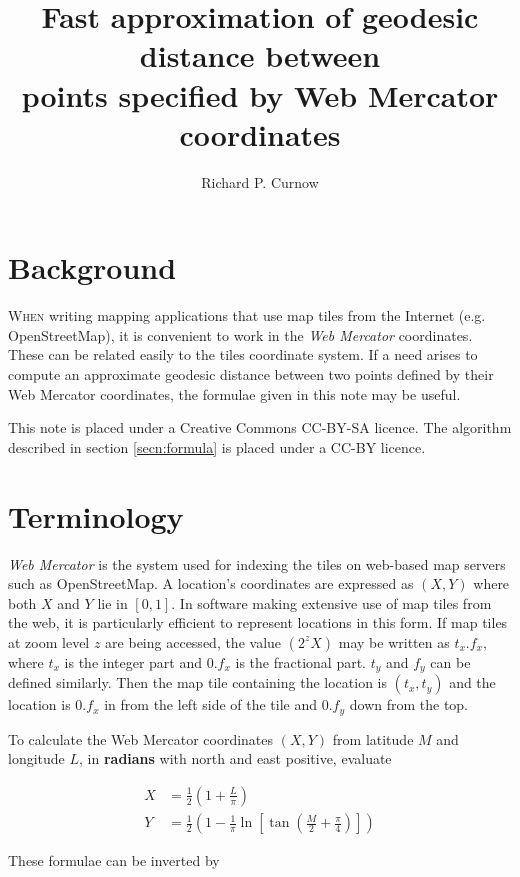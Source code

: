 \documentclass[10pt,a4paper,twocolumn]{article}
\title{Fast approximation of geodesic distance between\\points specified by Web Mercator coordinates}
\author{Richard P. Curnow}
\begin{document}
\maketitle

\section {Background}
\lettrine{W}{hen} writing mapping applications \cite{app} that use map tiles
from the Internet (e.g.  OpenStreetMap), it is convenient to work in the
\textit{Web Mercator} coordinates.  These can be related easily to the tiles
coordinate system.  If a need arises to compute an approximate geodesic
distance between two points defined by their Web Mercator coordinates, the
formulae given in this note may be useful.

This note is placed under a Creative Commons CC-BY-SA licence.  The algorithm
described in section \ref{secn:formula} is placed under a CC-BY licence.

\section {Terminology}
\textit{Web Mercator} is the system used for indexing the tiles on web-based
map servers such as OpenStreetMap.  A location's coordinates are expressed as
$(X,Y)$ where both $X$ and $Y$ lie in $[0,1]$.  In software making extensive
use of map tiles from the web, it is particularly efficient to represent
locations in this form.  If map tiles at zoom level $z$ are being accessed, the
value $(2^zX)$ may be written as $t_x . f_x$, where $t_x$ is the integer
part and $0.f_x$ is the fractional part.  $t_y$ and $f_y$ can be defined
similarly.  Then the map tile containing the location is $(t_x,t_y)$ and the
location is $0.f_x$ in from the left side of the tile and $0.f_y$ down from the
top.

To calculate the Web Mercator coordinates $(X,Y)$ from latitude $M$ and
longitude $L$, in \textbf{radians} with north and east positive, evaluate

\begin{align}
  X & = \frac{1}{2}\left(1 + \frac{L}{\pi} \right) \label{eqn:wmx} \\
  Y & = \frac{1}{2} \left(
        1 - \frac{1}{\pi} \ln \left[
          \tan\left(\frac{M}{2} + \frac{\pi}{4}\right)
        \right]
        \right)
\end{align}

These formulae can be inverted by
\end{document}
